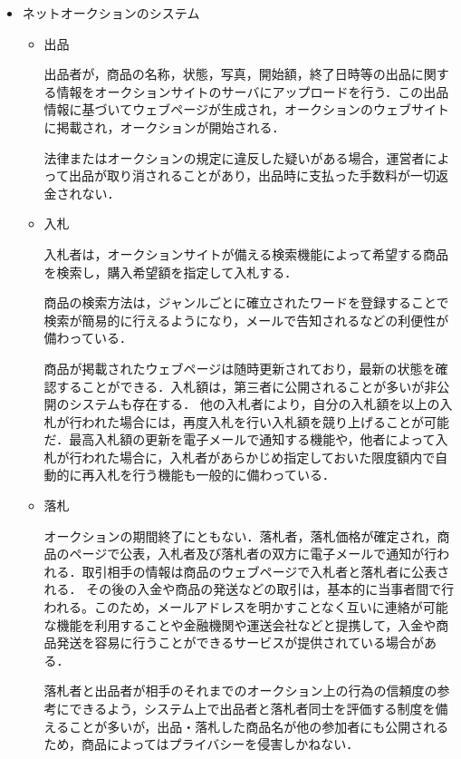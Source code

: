 \begin{itemize}

 \item	ネットオークションのシステム

\begin{itemize}
\setlength{\parskip}{3mm}

 \item	出品

出品者が，商品の名称，状態，写真，開始額，終了日時等の出品に関する情報をオークションサイトのサーバにアップロードを行う．この出品情報に基づいてウェブページが生成され，オークションのウェブサイトに掲載され，オークションが開始される．

法律またはオークションの規定に違反した疑いがある場合，運営者によって出品が取り消されることがあり，出品時に支払った手数料が一切返金されない．

 \item	入札

入札者は，オークションサイトが備える検索機能によって希望する商品を検索し，購入希望額を指定して入札する．

商品の検索方法は，ジャンルごとに確立されたワードを登録することで検索が簡易的に行えるようになり，メールで告知されるなどの利便性が備わっている．

商品が掲載されたウェブページは随時更新されており，最新の状態を確認することができる．入札額は，第三者に公開されることが多いが非公開のシステムも存在する．
他の入札者により，自分の入札額を以上の入札が行われた場合には，再度入札を行い入札額を競り上げることが可能だ．最高入札額の更新を電子メールで通知する機能や，他者によって入札が行われた場合に，入札者があらかじめ指定しておいた限度額内で自動的に再入札を行う機能も一般的に備わっている．

 \item	落札

オークションの期間終了にともない．落札者，落札価格が確定され，商品のページで公表，入札者及び落札者の双方に電子メールで通知が行われる．取引相手の情報は商品のウェブページで入札者と落札者に公表される．
その後の入金や商品の発送などの取引は，基本的に当事者間で行われる。このため，メールアドレスを明かすことなく互いに連絡が可能な機能を利用することや金融機関や運送会社などと提携して，入金や商品発送を容易に行うことができるサービスが提供されている場合がある．

落札者と出品者が相手のそれまでのオークション上の行為の信頼度の参考にできるよう，システム上で出品者と落札者同士を評価する制度を備えることが多いが，出品・落札した商品名が他の参加者にも公開されるため，商品によってはプライバシーを侵害しかねない．


\end{itemize}
\end{itemize}
